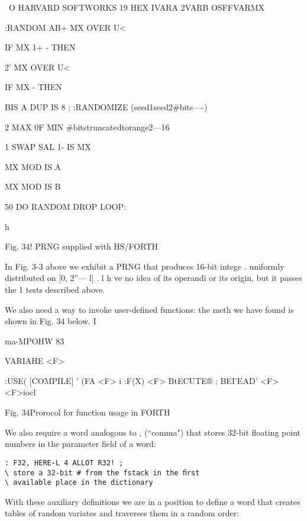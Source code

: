  

 

\ O HARVARD SOFTWORKS 19%
HEX
IVARA 2VARB OSFFVARMX

:RANDOM AB+ MX OVER U<

IF MX 1+ - THEN

2' MX OVER U<

IF MX - THEN

BIS A DUP IS 8 ;
:RANDOMIZE (seed1seed2#bits—-)

2 MAX 0F MIN \#bitstruncatedtorange2—16

1 SWAP SAL 1- IS MX

MX MOD IS A

MX MOD IS B

50 DO RANDOM DROP LOOP:

 

h

Fig. 34! PRNG supplied with HS/FORTH

In Fig. 3-3 above we exhibit a PRNG that produces 16-bit intege .
uniformly distributed on [0, 2”— l] . l h ve no idea of its
operandi or its origin, but it passes the 1 tests described above.

We also need a way to invoke user-deﬁned functions: the meth
we have found is shown in Fig. 34 below. I

ma-MPOHW 83

 

VARIAHE <F>

:USE( [COMPILE] ' (FA <F> i
:F(X) <F> BtECUTE® ;
BEI'EAD' <F> \rrllto<F>iocl

 

 

 

Fig. 34Prorocol for function usage in FORTH

We also require a word analogous to , (“comma") that stores
32-bit floating point numbers in the parameter ﬁeld of a word:

\begin{verbatim}
: F32, HERE-L 4 ALLOT R32! ;
\ store a 32-bit # from the fstack in the ﬁrst
\ available place in the dictionary
\end{verbatim}

With these auxiliary deﬁnitions we are in a position to deﬁne a
word that creates tables of random variates and traverses them in a random order:

